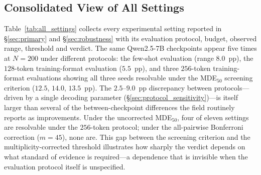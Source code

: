 \documentclass[pdflatex,sn-mathphys-ay,oneside]{sn-jnl}
\theoremstyle{thmstylethree}
\begin{document}
\subsection{Consolidated View of All Settings}\label{sec:consolidated}

Table~\ref{tab:all_settings} collects every experimental setting reported in \S\ref{sec:primary} and \S\ref{sec:robustness} with its evaluation protocol, budget, observed range, threshold and verdict. The same Qwen2.5-7B checkpoints appear five times at $N=200$ under different protocols: the few-shot evaluation (range $8.0$~pp), the $128$-token training-format evaluation ($5.5$~pp), and three $256$-token training-format evaluations showing all three seeds resolvable under the MDE$_{50}$ screening criterion ($12.5$, $14.0$, $13.5$~pp). The $2.5$--$9.0$~pp discrepancy between protocols---driven by a single decoding parameter (\S\ref{sec:protocol_sensitivity})---is itself larger than several of the between-checkpoint differences the field routinely reports as improvements. Under the uncorrected MDE$_{50}$, four of eleven settings are resolvable under the $256$-token protocol; under the all-pairwise Bonferroni correction ($m=45$), none are. This gap between the screening criterion and the multiplicity-corrected threshold illustrates how sharply the verdict depends on what standard of evidence is required---a dependence that is invisible when the evaluation protocol itself is unspecified.
\end{document}
